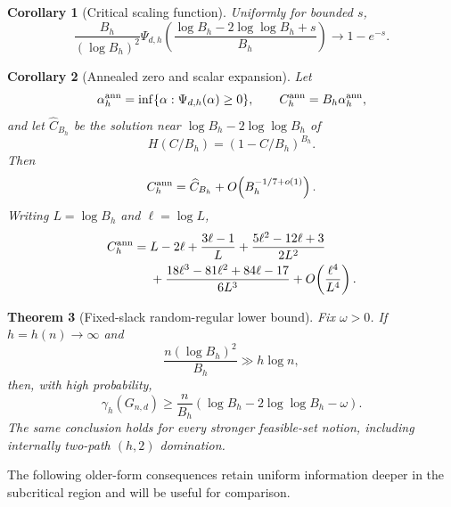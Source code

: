 \documentclass[11pt]{amsart}
\newtheorem{theorem}{Theorem}[section]
\newtheorem{corollary}[theorem]{Corollary}
\theoremstyle{definition}
\begin{document}
\begin{corollary}[Critical scaling function]\label{cor:critical-scaling-function}
Uniformly for bounded $s$,
\begin{equation}\label{eq:critical-scaling-function}
 \boxed{
 \frac{B_h}{(\log B_h)^2}
 \Psi_{d,h}\!\left(
 \frac{\log B_h-2\log\log B_h+s}{B_h}
 \right)
 \longrightarrow 1-e^{-s}.
 }
\end{equation}
\end{corollary}

\begin{corollary}[Annealed zero and scalar expansion]\label{cor:annealed-zero-expansion}
Let
\[
 \alpha_h^{\rm ann}
 =\inf\{\alpha:\Psi_{d,h}(\alpha)\ge0\},
 \qquad
 C_h^{\rm ann}=B_h\alpha_h^{\rm ann},
\]
and let $\widehat C_{B_h}$ be the solution near
$\log B_h-2\log\log B_h$ of
\begin{equation}\label{eq:scalar-coupon-root}
 H(C/B_h)=(1-C/B_h)^{B_h}.
\end{equation}
Then
\begin{equation}\label{eq:graph-scalar-zero}
 C_h^{\rm ann}
 =\widehat C_{B_h}+O\!\left(B_h^{-1/7+o(1)}\right).
\end{equation}
Writing $L=\log B_h$ and $\ell=\log L$,
\begin{align}
 C_h^{\rm ann}
 ={}&L-2\ell
 +\frac{3\ell-1}{L}
 +\frac{5\ell^2-12\ell+3}{2L^2}\notag\\
 &+\frac{18\ell^3-81\ell^2+84\ell-17}{6L^3}
 +O\!\left(\frac{\ell^4}{L^4}\right).
 \label{eq:annealed-zero-expansion}
\end{align}
\end{corollary}

\begin{theorem}[Fixed-slack random-regular lower bound]\label{thm:random-fixed-window}
Fix $\omega>0$.  If $h=h(n)\to\infty$ and
\begin{equation}\label{eq:fixed-window-growth}
 \frac{n(\log B_h)^2}{B_h}\gg h\log n,
\end{equation}
then, with high probability,
\begin{equation}\label{eq:random-fixed-window}
 \gamma_h(G_{n,d})
 \ge
 \frac n{B_h}
 \left(\log B_h-2\log\log B_h-\omega\right).
\end{equation}
The same conclusion holds for every stronger feasible-set notion, including internally two-path $(h,2)$ domination.
\end{theorem}

The following older-form consequences retain uniform information deeper in the subcritical region and will be useful for comparison.
\end{document}
